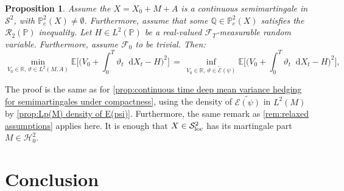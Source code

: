 \documentclass[11pt,a4paper,twoside,openany]{report}
\newcommand{\diff}{\mathop{}\!\mathrm{d}}
\theoremstyle{plain} %
\newtheorem{proposition}[proposition]{Proposition}
\theoremstyle{definition} %
\theoremstyle{remark} %
\begin{document}
\begin{proposition}\label{prop:continuous time deep mean variance hedging for semimartingales}
    Assume the \(X=X_0+M+A\) is a continuous semimartingale in \(\mathcal{S}^2\), with \(\mathbb{P}_e^2(X)\neq\emptyset\). Furthermore, assume that some \(\mathbb{Q}\in\mathbb{P}^2_e(X)\) satisfies the \(\mathcal{R}_2(\mathbb{P})\) inequality. Let \(H\in L^2(\mathbb{P})\) be a real-valued \(\mathcal{F}_{T}\)-measurable random variable. Furthermore, assume \(\mathcal{F}_0\) to be trivial. Then:
\begin{equation}\label{eq:martingale setup, continuous deep variance hedging}
    \min_{V_0\in\mathbb{R},\,\vartheta\in L^2(M,A)}\mathbb{E}\bigg[\bigg(V_0+\int_{0}^T\vartheta_t\diff X_t-H\bigg)^2\bigg]
    \,=\,\inf_{V_0\in\mathbb{R},\,\vartheta\in \widetilde{\mathcal{E}}(\psi)}
    \mathbb{E}\bigg[\bigg(V_0+\int_{0}^T\vartheta_t\diff X_t-H\bigg)^2\bigg],
\end{equation}
\end{proposition}
The proof is the same as for \cref{prop:continuous time deep mean variance hedging for semimartingales under compactness}, using the density of \(\widetilde{\mathcal{E}(\psi)}\) in \(L^2(M)\) by \cref{prop:Lp(M) density of E(psi)}.
Furthermore, the same remark as \cref{rem:relaxed assumptions} applies here. It is enough that \(X\in\mathcal{S}^2_{\rm{loc}}\) has its martingale part \(M\in\mathcal{H}_0^2\).



\chapter{Conclusion}
\end{document}

